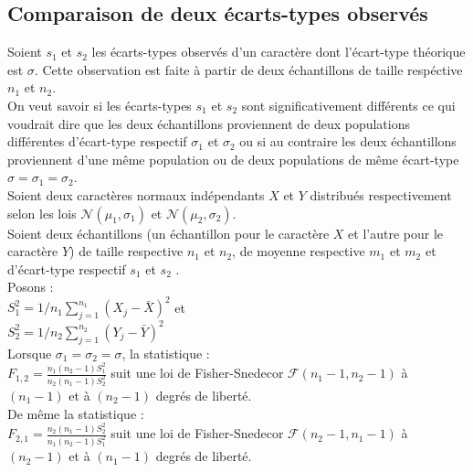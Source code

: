 \documentclass[a4paper,11pt]{book}
\begin{document}
\subsection{Comparaison de deux \'ecarts-types observ\'es}
Soient $s_1$ et $s_2$ les \'ecarts-types observ\'es d'un caract\`ere
dont l'\'ecart-type th\'eorique est $\sigma$. Cette observation est faite 
\`a partir de deux \'echantillons de taille resp\'ective $n_1$ et $n_2$.\\
On veut savoir si les \'ecarts-types $s_1$ et $s_2$ sont significativement 
diff\'erents ce qui voudrait dire que les deux \'echantillons proviennent de 
deux populations diff\'erentes d'\'ecart-type respectif $\sigma_1$ et $\sigma_2$
ou si au contraire les deux \'echantillons proviennent d'une m\^eme population 
ou de deux populations de m\^eme \'ecart-type $\sigma=\sigma_1=\sigma_2$.\\
Soient deux caract\`eres normaux ind\'ependants $X$ et $Y$ distribu\'es 
respectivement selon les lois $\mathcal N(\mu_1,\sigma_1)$ et 
$\mathcal N(\mu_2,\sigma_2)$.\\
Soient deux \'echantillons (un \'echantillon pour le caract\`ere $X$ et 
l'autre pour le caract\`ere $Y$)
de taille respective $n_1$ et $n_2$, de moyenne respective $m_1$ et $m_2$ et 
d'\'ecart-type respectif $s_1$ et $s_2$  .\\
Posons :\\
$S_1^2=1/n_1\sum_{j=1}^{n_1} (X_j-\bar X)^2$ et \\
$S_2^2=1/n_2\sum_{j=1}^{n_2} (Y_j-\bar Y)^2$ \\
Lorsque $\sigma_1=\sigma_2=\sigma$, la statistique :\\
$\displaystyle F_{1,2}=\frac{n_1(n_2-1)S_1^2}{n_2(n_1-1)S_2^2}$ suit une loi 
de Fisher-Snedecor $\mathcal F(n_1-1,n_2-1)$ \`a $(n_1-1)$ et \`a $(n_2-1)$ degr\'es de 
libert\'e.\\
 De m\^eme la statistique :\\
$\displaystyle F_{2,1}=\frac{n_2(n_1-1)S_2^2}{n_1(n_2-1)S_1^2}$ suit une loi 
de Fisher-Snedecor $\mathcal F(n_2-1,n_1-1)$ \`a $(n_2-1)$ et \`a $(n_1-1)$ 
degr\'es de libert\'e.
\end{document}
